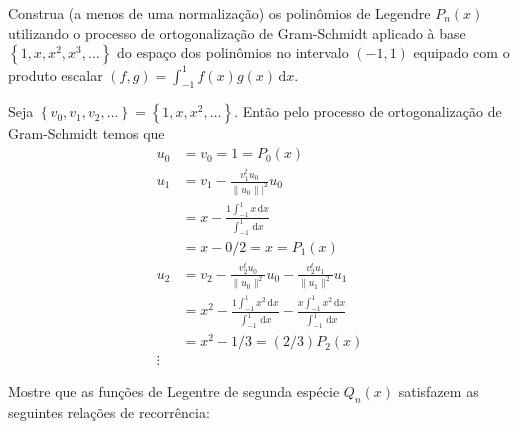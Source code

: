 \documentclass[a4paper,12pt, leqno, answers]{exam}
\begin{document}
\begin{questions}
    \question Construa (a menos de uma normaliza\c{c}\~{a}o) os polinômios de Legendre $P_n(x)$ utilizando o processo de ortogonaliza\c{c}\~{a}o de Gram-Schmidt aplicado \`{a} base $\left\{ 1, x, x^2, x^3, \ldots \right\}$ do espa\c{c}o dos polinômios no intervalo $(-1, 1)$ equipado com o produto escalar $(f, g) = \int_{-1}^1 f(x) g(x) \,\mathrm{d} x$.
    \begin{solution}
        Seja $\left\{ v_0, v_1, v_2, \ldots \right\} = \left\{ 1, x, x^2, \ldots \right\}$. Ent\~{a}o pelo processo de ortogonaliza\c{c}\~{a}o de Gram-Schmidt temos que
        \begin{align*}
            u_0 &= v_0 = 1 = P_0(x) \\
            u_1 &= v_1 - \frac{v_1^t u_0}{\| u_0 \||^2} u_0 \\
            &= x - \frac{1 \int_{-1}^1 x \,\mathrm{d}x}{\int_{-1}^1 \,\mathrm{d}x} \\
            &= x - 0 / 2 = x = P_1(x) \\
            u_2 &= v_2 - \frac{v_2^t u_0}{\| u_0 \|^2} u_0 - \frac{v_2^t u_1}{\| u_1 \|^2} u_1 \\
            &= x^2 - \frac{1 \int_{-1}^1 x^2 \,\mathrm{d}x}{\int_{-1}^1 \,\mathrm{d}x} - \frac{x \int_{-1}^1 x^2 \,\mathrm{d}x}{\int_{-1}^1 \,\mathrm{d}x} \\
            &= x^2 - 1/3 = (2/3) P_2(x) \\
            \vdots
        \end{align*}
    \end{solution}

    \question Mostre que as fun\c{c}\~{o}es de Legentre de segunda esp\'{e}cie $Q_n(x)$ satisfazem as seguintes rela\c{c}\~{o}es de recorr\^{e}ncia:
\end{questions}
\end{document}
